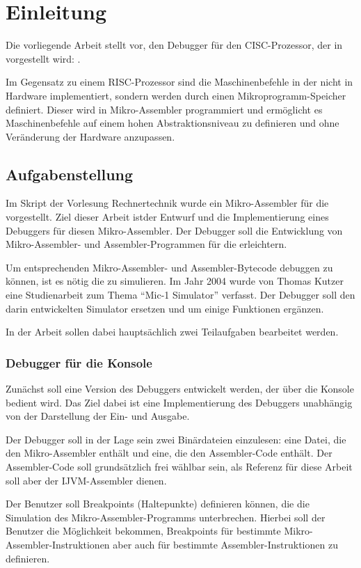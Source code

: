 \chapter*{Einleitung}
Die vorliegende Arbeit stellt \md{} vor, den Debugger für den CISC-Prozessor, der in \cite{Tanenbaum1998} vorgestellt wird: \mic.

Im Gegensatz zu einem RISC-Prozessor sind die Maschinenbefehle in der \mic{} nicht in Hardware implementiert, sondern werden durch einen Mikroprogramm-Speicher definiert. Dieser wird in Mikro-Assembler programmiert und ermöglicht es Maschinenbefehle auf einem hohen Abstraktionsniveau zu definieren und ohne Veränderung der Hardware anzupassen.

\section*{Aufgabenstellung}
Im Skript der Vorlesung Rechnertechnik  wurde ein Mikro-Assembler für die \mic{} vorgestellt. Ziel dieser Arbeit istder Entwurf und die Implementierung eines Debuggers für diesen Mikro-Assembler. Der Debugger soll die Entwicklung von Mikro-Assembler- und Assembler-Programmen für die \mic{} erleichtern.

Um entsprechenden Mikro-Assembler- und Assembler-Bytecode debuggen zu können, ist es nötig die \mic{} zu simulieren. Im Jahr 2004 wurde von Thomas Kutzer eine Studienarbeit zum Thema ``Mic-1 Simulator'' verfasst. Der Debugger soll den darin entwickelten Simulator ersetzen und um einige Funktionen ergänzen.

In der Arbeit sollen dabei hauptsächlich zwei Teilaufgaben bearbeitet werden.

\subsection*{Debugger für die Konsole}
Zunächst soll eine Version des Debuggers entwickelt werden, der über die Konsole bedient wird. Das Ziel dabei ist eine Implementierung des Debuggers unabhängig von der Darstellung der Ein- und Ausgabe.

Der Debugger soll in der Lage sein zwei Binärdateien einzulesen: eine Datei, die den Mikro-Assembler enthält und eine, die den Assembler-Code enthält. Der Assembler-Code soll grundsätzlich frei wählbar sein, als Referenz für diese Arbeit soll aber der IJVM-Assembler dienen.

Der Benutzer soll Breakpoints (Haltepunkte) definieren können, die die Simulation des Mikro-Assembler-Programms unterbrechen. Hierbei soll der Benutzer die Möglichkeit bekommen, Breakpoints für bestimmte Mikro-Assembler-Instruktionen aber auch für bestimmte Assembler-Instruktionen zu definieren.

